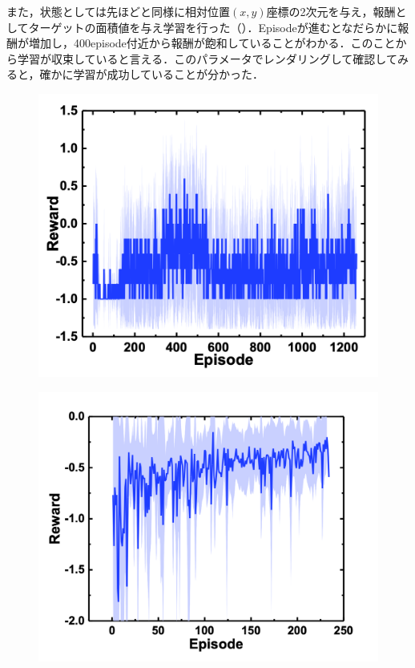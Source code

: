 また，状態としては先ほどと同様に相対位置$(x,y)$座標の2次元を与え，報酬としてターゲットの面積値を与え学習を行った（）．Episodeが進むとなだらかに報酬が増加し，400episode付近から報酬が飽和していることがわかる．このことから学習が収束していると言える．このパラメータでレンダリングして確認してみると，確かに学習が成功していることが分かった．

\begin{figure}
    \centering
    \begin{minipage}[t]{0.45\linewidth}
        \centering
        \includegraphics[width=\linewidth]{figure/chapter3/rew=01_obs=面積重心_origin}
        \label{fig:報酬離散}
    \end{minipage}
    \hspace*{\fill}
    \begin{minipage}[t]{0.45\linewidth}
        \centering
        \includegraphics[width=1.1\linewidth]{figure/chapter3/QL_rew=distance_obs=posvec_origin}

\end{minipage}
\end{figure}
